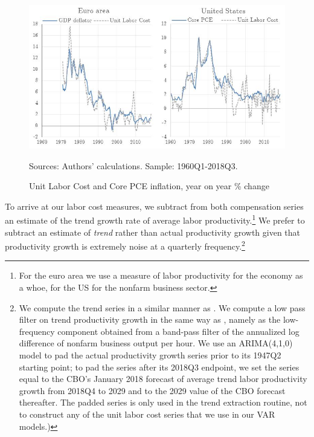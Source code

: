 \documentclass[11pt]{article}
\begin{document}
\begin{figure}[!htbp]
\begin{center}
\caption{Unit Labor Cost and Core PCE inflation, year on year \% change}\label{fig:yoy_inflation_LC}
\includegraphics[scale = .95]{Chart_EAUS_data.jpg}
\begin{minipage}{0.92\textwidth} {\footnotesize
Sources: Authors' calculations.
Sample: 1960Q1-2018Q3.\par}
\end{minipage}
\end{center}
\end{figure}


To arrive at our labor cost measures, we subtract from both compensation series an estimate of the trend growth rate of average labor productivity.\footnote{For the euro area we use a measure of labor productivity for the economy as a whoe, for the US for the nonfarm business sector.} We prefer to subtract an estimate of \textit{trend} rather than actual productivity growth given that productivity growth is extremely noise at a quarterly frequency.\footnote{We compute the trend series in a similar manner as \cite{Peneva_Rudd_2017}. We compute a low pass filter on trend productivity growth in the same way as \cite{SSW01}, namely as the low-frequency component obtained from a band-pass filter of the annualized log difference of nonfarm business output per hour. We use an ARIMA(4,1,0) model to pad the actual productivity growth series prior to its 1947Q2 starting point; to pad the series after its 2018Q3 endpoint, we set the series equal to the CBO’s January 2018 forecast of average trend labor productivity growth from 2018Q4 to 2029 and to the 2029 value of the CBO forecast thereafter. The padded series is only used in the trend extraction routine, not to construct any of the unit labor cost series that we use in our VAR models.)}
\end{document}
